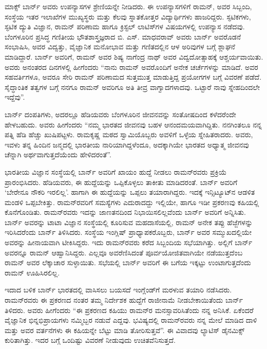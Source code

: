 ಮಾಕ್ಸ್ ಬಾರ್ನ್ ಅವರು ಉಪನ್ಯಾಸಗಳ ಶ್ರೇಣಿಯನ್ನೇ ನೀಡಿದರು. ಈ ಉಪನ್ಯಾಸಗಳಿಗೆ ರಾಮನ್, ಅವರ ಸಿಬ್ಬಂದಿ, ಸಂಸ್ಥೆಯ ಇತರ ಇಲಾಖೆಗಳ ಮುಖ್ಯಸ್ಥರು ಮತ್ತು ಕೆಲವು ಸ್ನಾತಕೋತ್ತರ ವಿದ್ಯಾರ್ಥಿಗಳು ಹಾಜರಿದ್ದರು. ಸ್ಫಟಿಕಗಳು, ಸ್ಫಟಿಕ ದ್ಯುತಿ ವಿಜ್ಞಾನ, ರಾಮನ್ ಪರಿಣಾಮ ಹಾಗೂ ಕ್ರಿಸ್ಟಲ್ ಲಾಟಿಸ್‍ಗಳ ವಿಷಯಗಳಲ್ಲಿ ಉಪನ್ಯಾಸ ನಡೆದವು. ಬೆಂಗಳೂರಿನ ಪ್ರಸಿದ್ಧ ಗಣಿತೀಯ ಭೌತಶಾಸ್ತ್ರಜ್ಞರಾದ ಬಿ. ಎಸ್. ಮಾಧವರಾವ್ ಅವರು ಬಾರ್ನ್ ಅವರೊಡನೆ ಸಂಭಾಷಿಸಿ, ಅವರ ವಿದ್ವತ್ತು, ವೈಜ್ಞಾನಿಕ ಮನೋಭಾವ ಮತ್ತು ಗಣಿತದಲ್ಲಿನ ಆಳ ಅರಿವುಗಳ ಬಗ್ಗೆ ಶ್ಲಾಘನೆ ಮಾಡಿದ್ದಾರೆ. ಬಾರ್ನ್ ಅವರಿಗೆ, ರಾಮನ್ ಅವರ ಶಿಷ್ಯ ನಾಗೆಂದ್ರ ನಾಥ್ ಅವರ ವಿದ್ವದೋತ್ಸಾಹಕ್ಕೆ ಆಶ್ಚರ್ಯವಾಯಿತು. ಅವರು ಅನಂತರದ ದಿನಗಳಲ್ಲಿ ಹೀಗೆಂದರು\enginline{--} “ನಾನು ರಾಮನ್ ಅವರೊಂದಿಗೆ ಅನೇಕ ಚರ್ಚೆಗಳನ್ನು ಮಾಡಿದೆ. ಅವರ ಸಹವರ್ತಿಗಳೂ, ಅವರೂ ಸೇರಿ ರಾಮನ್ ಪರಿಣಾಮದ ಸುತ್ತಮುತ್ತ ಮಾಡುತ್ತಿದ್ದ ಪ್ರಯೋಗಗಳ ಬಗ್ಗೆ ವಿವರಣೆ ಪಡೆದೆ. ಸೈದ್ಧಾಂತಿಕ ತತ್ವಗಳ ಬಗ್ಗೆ ನನಗೂ ರಾಮನ್ ಅವರಿಗೂ ಅತಿ ತೀವ್ರ ವಾಗ್ವಾದಗಳಾದವು. ಒಟ್ಟಾರೆ ನಾವು ಸ್ನೇಹದಿಂದಲೇ ಇದ್ದೆವು”.

ಬಾರ್ನ್ ದಂಪತಿಗಳು, ಅದರಲ್ಲೂ ಹೆಡಿಯವರು ಬೆಂಗಳೂರಿನ ಜೀವನವನ್ನು ಸಂತೋಷದಿಂದ ಕಳೆದರೆಂದೇ ಹೇಳಬಹುದು. ಅವರು ಹೀಗೆಂದರು\enginline{--} “ನಮ್ಮ ಭಾರತದ ಜೀವನವು ಬಹಳ ಆನಂದಮಯವಾಗಿದ್ದಿತು. ನನಗಿಂತಲೂ ನನ್ನ ಪತ್ನಿ ಹೆಡಿ ಹೆಚ್ಚು ಖುಷಿಪಟ್ಟಳು. ರಾಮಕೃಷ್ಣ ಮಠದ ಸ್ವಾಮಿಯೊಬ್ಬರು ಅವಳಿಗೆ ಒಳ್ಳೆಯ ಸ್ನೇಹಿತರಾದರು. ಅವರು, ಇವಳು ತನ್ನ ಹಿಂದಿನ ಜನ್ಮದಲ್ಲಿ ಭಾರತೀಯ ನಾರಿಯಾಗಿದ್ದಳೆಂದೂ, ಅದಕ್ಕಾಗಿಯೇ ಭಾರತದ ಅಧ್ಯಾತ್ಮ ಜೀವನವು ಚೆನ್ನಾಗಿ ಅರ್ಥವಾಗುತ್ತದೆಯೆಂದು ಹೇಳಿದರಂತೆ”.

ಭಾರತೀಯ ವಿಜ್ಞಾನ ಸಂಸ್ಥೆಯಲ್ಲಿ ಬಾರ್ನ್ ಅವರಿಗೆ ಖಾಯಂ ಹುದ್ದೆ ನೀಡಲು ರಾಮನ್‍ರವರು ಪ್ರಕ್ರಿಯೆ ಪ್ರಾರಂಭಿಸಿದರು. ಹೆಡಿಯವರು, ಈ ಹುದ್ದೆಯನ್ನು ಒಪ್ಪಿಕೊಳ್ಳಲು ತಾಕೀತು ಮಾಡಿದರಂತೆ. ಬಾರ್ನ್ ಅವರಿಗೆ ‘ಬೇರೇನೂ ನೌಕರಿ ಇರಲಿಲ್ಲ’. ಹಾಗಾಗಿ ಈ ಹುದ್ದೆಯನ್ನು ಒಪ್ಪಲು ತಯಾರಾಗಿದ್ದರು. ಇದಕ್ಕೆ ಇನ್ಸಿಟ್ಯೂಟ್‍ನ ಆಡಳಿತ ಮಂಡಳಿ ಒಪ್ಪಬೇಕಿತ್ತು. ರಾಮನ್‍ರವರಿಗೆ ಸಮಸ್ಯೆಗಳು ಎದುರಾದದ್ದು ಇಲ್ಲಿಯೇ, ಹಾಗೂ ಇಡೀ ಪ್ರಕರಣವು ಕಹಿಯಲ್ಲಿ ಕೊನೆಗೊಂಡಿತು. ರಾಮನ್‍ರವರು ಇದನ್ನು ಜಾಣತನದಿಂದ ನಿಭಾಯಿಸಲಿಲ್ಲವೆಂದು ಬಾರ್ನ್ ಅವರಿಗೆ ಅನ್ನಿಸಿತು. ಬಾರ್ನ್ ಅವರನ್ನು ಟಾಟಾ ವಿಜ್ಞಾನ ಸಂಸ್ಥೆಯಲ್ಲಿ ಕೂರಿಸುವ ಮಹದಾಸೆಯಲ್ಲಿ, ರಾಮನ್ ಅನೇಕ ತಪ್ಪು ಹೆಜ್ಜೆಗಳನ್ನು ಇರಿಸಿದರೆಂದು ಬಾರ್ನ್ ತಿಳಿಸಿದರು. ಸಂಸ್ಥೆಯ ಇಂಗ್ಲಿಷ್ ಪ್ರಾಧ್ಯಾಪಕರೊಬ್ಬರು, ಬಾರ್ನ್ ಅವರ ಸಮ್ಮುಖದಲ್ಲಿಯೇ ಅವರನ್ನು ಹೀನಾಯವಾಗಿ ಟೀಕಿಸಿದ್ದರು. ಇದು ರಾಮನ್‍ರವರು ಕರೆದ ಸಿಬ್ಬಂದಿಯ ಸಭೆಯಾಗಿತ್ತು. ಅಲ್ಲಿಗೆ ಬಾರ್ನ್ ಅವರನ್ನೂ ರಾಮನ್ ಆಹ್ವಾನಿಸಿದ್ದರು. ಎಲ್ಲವೂ ಅವರೆಣಿಸಿದಂತೆ ಪೂರ್ವಯೋಜಿತವಾಗಿಯೇ ನಡೆಯುತ್ತದೆಂಬ ರಾಮನ್ ಅವರ ಲೆಕ್ಕಾಚಾರ ಸುಳ್ಳಾಯಿತು. ಸಭೆಯಲ್ಲಿ ಬಾರ್ನ್ ಅವರಿಗೆ ಈ ಬಗೆಯ ಇಕ್ಕಟ್ಟು ಉಂಟಾಗುತ್ತದೆಂದು ರಾಮನ್ ಊಹಿಸಿರಲಿಲ್ಲ.

ಇದಾದ ಬಳಿಕ ಬಾರ್ನ್ ಭಾರತದಲ್ಲಿ ವಾಸಿಸಲು ಬಯಸದೆ ಇಂಗ್ಲೆಂಡ್‍ಗೆ ಮರಳುವ ತಯಾರಿ ನಡೆಸಿದರು. ರಾಮನ್‍ರವರು ಈ ಪ್ರಕರಣದ ನಂತರ ತಮ್ಮ ನಿರ್ದೇಶಕ ಹುದ್ದೆಗೆ ರಾಜೀನಾಮೆ ನೀಡಬೇಕಾಯಿತೆಂದು ಬಾರ್ನ್ ತಿಳಿದರು. ಅವರು ಹೀಗೆಂದರು\enginline{--} “ಈ ಪ್ರಕರಣದ ಕಹಿಯು ರಾಮನ್‍ರ ಮನಸ್ಸಾವರಿಸಿತೆಂದು ನನ್ನ ಅನಿಸಿಕೆ. ಏಕೆಂದರೆ ವೈಜ್ಞಾನಿಕ ಭಿನ್ನಭಿಪ್ರಾಯಗಳು ನಮ್ಮಿಬ್ಬರ ನಡುವೆ ಎದ್ದವು. ಭವಿಷ್ಯದಲ್ಲಿ ರಾಮನ್‍ರವರು ನನ್ನ ಮೇಲೆ ಮಾಡಿದ ದಾಳಿ ಮತ್ತು ಅವರ ವರ್ತನೆಗಳು ಈ ಕಹಿಯನ್ನೇ ಬೆಟ್ಟು ಮಾಡಿ ತೋರಿಸುತ್ತವೆ”. ಈ ವಿವಾದವು ಲ್ಯಾಟಿಸ್ ಡೈನಮಿಕ್ಸ್ ಕುರಿತಾಗಿತ್ತು. ಇದರ ಬಗ್ಗೆ ಒಂದಿಷ್ಟು ವಿವರಣೆ ನೀಡುವುದು ಉಚಿತವೆನಿಸುತ್ತದೆ.


